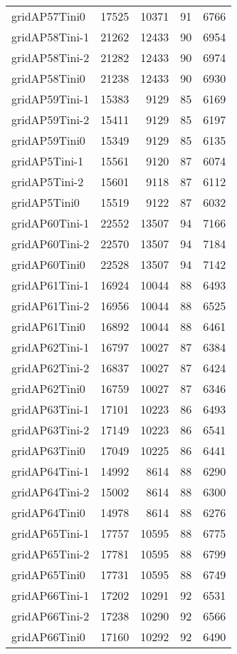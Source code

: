 \documentclass[../../../thesis.tex]{subfiles}
\begin{document}
\begin{longtable}{lrrrr}
gridAP57Tini0 & 17525 & 10371 & 91 & 6766 \\
gridAP58Tini-1 & 21262 & 12433 & 90 & 6954 \\
gridAP58Tini-2 & 21282 & 12433 & 90 & 6974 \\
gridAP58Tini0 & 21238 & 12433 & 90 & 6930 \\
gridAP59Tini-1 & 15383 & 9129 & 85 & 6169 \\
gridAP59Tini-2 & 15411 & 9129 & 85 & 6197 \\
gridAP59Tini0 & 15349 & 9129 & 85 & 6135 \\
gridAP5Tini-1 & 15561 & 9120 & 87 & 6074 \\
gridAP5Tini-2 & 15601 & 9118 & 87 & 6112 \\
gridAP5Tini0 & 15519 & 9122 & 87 & 6032 \\
gridAP60Tini-1 & 22552 & 13507 & 94 & 7166 \\
gridAP60Tini-2 & 22570 & 13507 & 94 & 7184 \\
gridAP60Tini0 & 22528 & 13507 & 94 & 7142 \\
gridAP61Tini-1 & 16924 & 10044 & 88 & 6493 \\
gridAP61Tini-2 & 16956 & 10044 & 88 & 6525 \\
gridAP61Tini0 & 16892 & 10044 & 88 & 6461 \\
gridAP62Tini-1 & 16797 & 10027 & 87 & 6384 \\
gridAP62Tini-2 & 16837 & 10027 & 87 & 6424 \\
gridAP62Tini0 & 16759 & 10027 & 87 & 6346 \\
gridAP63Tini-1 & 17101 & 10223 & 86 & 6493 \\
gridAP63Tini-2 & 17149 & 10223 & 86 & 6541 \\
gridAP63Tini0 & 17049 & 10225 & 86 & 6441 \\
gridAP64Tini-1 & 14992 & 8614 & 88 & 6290 \\
gridAP64Tini-2 & 15002 & 8614 & 88 & 6300 \\
gridAP64Tini0 & 14978 & 8614 & 88 & 6276 \\
gridAP65Tini-1 & 17757 & 10595 & 88 & 6775 \\
gridAP65Tini-2 & 17781 & 10595 & 88 & 6799 \\
gridAP65Tini0 & 17731 & 10595 & 88 & 6749 \\
gridAP66Tini-1 & 17202 & 10291 & 92 & 6531 \\
gridAP66Tini-2 & 17238 & 10290 & 92 & 6566 \\
gridAP66Tini0 & 17160 & 10292 & 92 & 6490 \\

\end{longtable}
\end{document}
